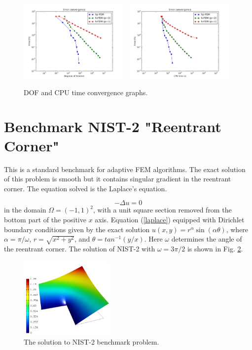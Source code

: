 \documentclass[12pt]{elsarticle}
\begin{document}
\begin{figure}[!ht]
\centering
\includegraphics[height=4cm]{nist/nist-1/conv_dof_aniso.png}\ \
\includegraphics[height=4cm]{nist/nist-1/conv_cpu_aniso.png}
\caption{DOF and CPU time convergence graphs.}
\label{fig:nist-1-conv}
\end{figure}


\section{Benchmark NIST-2 "Reentrant Corner"}
\label{sec:bench-2}

This is a standard benchmark for adaptive FEM algorithms.
The exact solution of this problem is smooth but it contains
singular gradient in the reentrant corner.
The equation solved is the Laplace's equation.

\begin{equation} \label{laplace}
-\Delta u = 0
\end{equation}
in the domain $\Omega = (-1, 1)^2$, with a unit square
section removed from the bottom part of the positive $x$ axis.
Equation (\ref{laplace}) equipped with Dirichlet
boundary conditions given by the exact solution
$u(x, y) = r^{\alpha}\sin(\alpha \theta)$,
where $\alpha = \pi / \omega$, $r = \sqrt{x^2+y^2}$,
and $\theta = tan^{-1}(y/x)$. Here $\omega $ determines
the angle of the reentrant corner.
The solution of NIST-2 with $\omega = 3 \pi / 2$
is shown in Fig. \ref{fig:sln-nist02}.

\begin{figure}[!ht]
\centering
\includegraphics[height=4cm]{nist/nist-2/solution.png}
\caption{The solution to NIST-2 benchmark problem.}
\label{fig:sln-nist02}
\end{figure}
\end{document}
